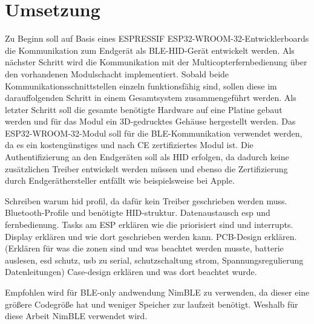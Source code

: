 
\chapter{Umsetzung}

Zu Beginn soll auf Basis eines ESPRESSIF ESP32-WROOM-32-Entwicklerboards die Kommunikation zum Endgerät als BLE-HID-Gerät entwickelt werden. Als nächster Schritt wird die Kommunikation mit
der Multicopterfernbedienung über den vorhandenen Modulschacht implementiert. Sobald beide Kommunikationsschnittstellen einzeln funktionsfähig sind, sollen diese im darauffolgenden Schritt in einem
Gesamtsystem zusammengeführt werden. Als letzter Schritt soll die gesamte benötigte Hardware auf eine Platine gebaut werden und für das Modul ein 3D-gedrucktes Gehäuse hergestellt werden.
Das ESP32-WROOM-32-Modul soll für die BLE-Kommunikation verwendet werden, da es ein kostengünstiges und nach CE zertifiziertes Modul ist. Die Authentifizierung an den Endgeräten soll als HID erfolgen, da dadurch keine zusätzlichen Treiber entwickelt werden müssen und ebenso die Zertifizierung durch Endgeräthersteller entfällt wie beispielsweise bei Apple.

Schreiben warum hid profil, da dafür kein Treiber geschrieben werden muss.
Bluetooth-Profile und benötigte HID-struktur.
Datenaustausch esp und fernbedienung.
Tasks am ESP erklären wie die priorisiert sind und interrupts.
Display erklären und wie dort geschrieben werden kann.
PCB-Design erklären. (Erklären für was die zonen sind und was beachtet werden musste, batterie auslesen, esd schutz, usb zu serial, schutzschaltung strom, Spannungsregulierung Datenleitungen)
Case-design erklären und was dort beachtet wurde.

Empfohlen wird für BLE-only andwendung NimBLE zu verwenden, da dieser eine größere Codegröße hat und weniger Speicher zur laufzeit benötigt. Weshalb für diese Arbeit NimBLE verwendet wird. \cite{espidfBluetoothStack}